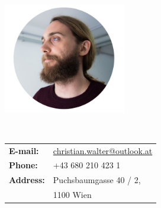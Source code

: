 
\begin{multicols}{2}

  \begingroup \centering \includegraphics[width=0.4\textwidth]{./figs/chris.jpg} \endgroup\\

  \vspace{0.5cm}

  \\

  \begin{tabular} { l l }
    \textbf{E-mail:} & \href{mailto:christian.walter@outlook.at}{christian.walter@outlook.at}\\
    \textbf{Phone:} & +43 680 210 423 1\\
    \textbf{Address:} & Puchsbaumgasse 40 / 2,\\
    & 1100 Wien\\
  \end{tabular}

\end{multicols}